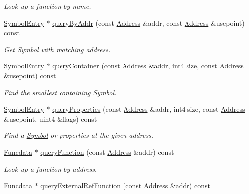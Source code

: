 \begin{DoxyCompactItemize}
\begin{DoxyCompactList}\small\item\em Look-\/up a function by name. \end{DoxyCompactList}\item 
\mbox{\hyperlink{class_symbol_entry}{Symbol\+Entry}} $\ast$ \mbox{\hyperlink{class_scope_afc95566b073624a0d12231a8e70bc5ce}{query\+By\+Addr}} (const \mbox{\hyperlink{class_address}{Address}} \&addr, const \mbox{\hyperlink{class_address}{Address}} \&usepoint) const
\begin{DoxyCompactList}\small\item\em Get \mbox{\hyperlink{class_symbol}{Symbol}} with matching address. \end{DoxyCompactList}\item 
\mbox{\hyperlink{class_symbol_entry}{Symbol\+Entry}} $\ast$ \mbox{\hyperlink{class_scope_af50dcbdbad011571fc24398781a2bab2}{query\+Container}} (const \mbox{\hyperlink{class_address}{Address}} \&addr, int4 size, const \mbox{\hyperlink{class_address}{Address}} \&usepoint) const
\begin{DoxyCompactList}\small\item\em Find the smallest containing \mbox{\hyperlink{class_symbol}{Symbol}}. \end{DoxyCompactList}\item 
\mbox{\hyperlink{class_symbol_entry}{Symbol\+Entry}} $\ast$ \mbox{\hyperlink{class_scope_a1b8c2c2302eba2666e319a4c18a67d51}{query\+Properties}} (const \mbox{\hyperlink{class_address}{Address}} \&addr, int4 size, const \mbox{\hyperlink{class_address}{Address}} \&usepoint, uint4 \&flags) const
\begin{DoxyCompactList}\small\item\em Find a \mbox{\hyperlink{class_symbol}{Symbol}} or properties at the given address. \end{DoxyCompactList}\item 
\mbox{\hyperlink{class_funcdata}{Funcdata}} $\ast$ \mbox{\hyperlink{class_scope_a5d6c56240bdb6df2d2670077cf5e08ca}{query\+Function}} (const \mbox{\hyperlink{class_address}{Address}} \&addr) const
\begin{DoxyCompactList}\small\item\em Look-\/up a function by address. \end{DoxyCompactList}\item 
\mbox{\hyperlink{class_funcdata}{Funcdata}} $\ast$ \mbox{\hyperlink{class_scope_a7850e4fd00c5dcc9299e646d13aae3dc}{query\+External\+Ref\+Function}} (const \mbox{\hyperlink{class_address}{Address}} \&addr) const

\end{DoxyCompactItemize}
